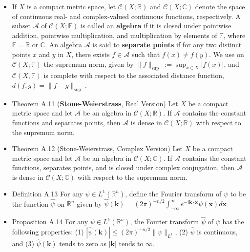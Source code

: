 \begin{itemize}
\item If $X$ is a compact metric space, let $\mathcal{C}(X ; \mathbb{R})$ and $\mathcal{C}(X ; \mathbb{C})$ denote the space of continuous real- and complex-valued continuous functions, respectively. A subset $\mathcal{A}$ of $\mathcal{C}(X ; \mathbb{F})$ is called an \textbf{algebra} if it is closed under pointwise addition, pointwise multiplication, and multiplication by elements of $\mathbb{F}$, where $\mathbb{F}=\mathbb{R}$ or $\mathbb{C}$. An algebra $\mathcal{A}$ is said to \textbf{separate points} if for any two distinct points $x$ and $y$ in $X$, there exists $f \in \mathcal{A}$ such that $f(x) \neq f(y)$. We use on $\mathcal{C}(X ; \mathbb{F})$ the supremum norm, given by $\|f\|_{\text {sup }}:=\sup _{x \in X}|f(x)|$, and $\mathcal{C}(X, \mathbb{F})$ is complete with respect to the associated distance function, $d(f, g)=\|f-g\|_{\text {sup }}$.

\item Theorem A.11 (\textbf{Stone-Weierstrass}, Real Version) Let $X$ be a compact metric space and let $\mathcal{A}$ be an algebra in $\mathcal{C}(X ; \mathbb{R})$. If $\mathcal{A}$ contains the constant functions and separates points, then $\mathcal{A}$ is dense in $\mathcal{C}(X ; \mathbb{R})$ with respect to the supremum norm.

\item Theorem A.12 (Stone-Weierstrass, Complex Version) Let $X$ be a compact metric space and let $\mathcal{A}$ be an algebra in $\mathcal{C}(X ; \mathbb{C})$. If $\mathcal{A}$ contains the constant functions, separates points, and is closed under complex conjugation, then $\mathcal{A}$ is dense in $\mathcal{C}(X ; \mathbb{C})$ with respect to the supremum norm.

\item Definition A.13 For any $\psi \in L^{1}\left(\mathbb{R}^{n}\right)$, define the Fourier transform of $\psi$ to be the function $\hat{\psi}$ on $\mathbb{R}^{n}$ given by $\hat{\psi}(\mathbf{k})=(2 \pi)^{-n / 2} \int_{-\infty}^{\infty} e^{-i \mathbf{k} \cdot \mathbf{x}} \psi(\mathbf{x}) d \mathbf{x}$

\item Proposition A.14 For any $\psi \in L^{1}\left(\mathbb{R}^{n}\right)$, the Fourier transform $\hat{\psi}$ of $\psi$ has the following properties: (1) $|\hat{\psi}(\mathbf{k})| \leq(2 \pi)^{-n / 2}\|\psi\|_{L^{1}}$, (2) $\hat{\psi}$ is continuous, and (3) $\hat{\psi}(\mathbf{k})$ tends to zero as $|\mathbf{k}|$ tends to $\infty$.
\end{itemize}

